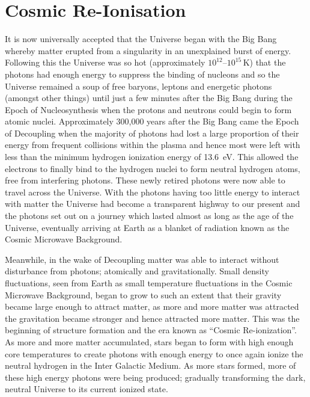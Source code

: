
\section{Cosmic Re-Ionisation} %
\label{sec:cosmic_re_ionisation}
	It is now universally accepted that the Universe began with the Big Bang whereby matter erupted from a singularity in an unexplained burst of energy. Following this the Universe was so hot (approximately $10^{12}$--$10^{15}$\,\si{\kelvin}\cite{liddle2003introduction}) that the photons had enough energy to suppress the binding of nucleons and so the Universe remained a soup of free baryons, leptons and energetic photons (amongst other things) until just a few minutes after the Big Bang during the Epoch of Nucleosynthesis when the protons and neutrons could begin to form atomic nuclei. Approximately 300,000\cite{liddle2003introduction} years after the Big Bang came the Epoch of Decoupling when the majority of photons had lost a large proportion of their energy from frequent collisions within the plasma and hence most were left with less than the minimum hydrogen ionization energy of \SI{13.6}{\electronvolt}. This allowed the electrons to finally bind to the hydrogen nuclei to form neutral hydrogen atoms, free from interfering photons. These newly retired photons were now able to travel across the Universe. With the photons having too little energy to interact with matter the Universe had become a transparent highway to our present and the photons set out on a journey which lasted almost as long as the age of the Universe, eventually arriving at Earth as a blanket of radiation known as the Cosmic Microwave Background.

	Meanwhile, in the wake of Decoupling matter was able to interact without disturbance from photons; atomically and gravitationally. Small density fluctuations, seen from Earth as small temperature fluctuations in the Cosmic Microwave Background, began to grow to such an extent that their gravity became large enough to attract matter, as more and more matter was attracted the gravitation became stronger and hence attracted more matter. This was the beginning of structure formation and the era known as ``Cosmic Re-ionization''. As more and more matter accumulated, stars began to form with high enough core temperatures to create photons with enough energy to once again ionize the neutral hydrogen in the Inter Galactic Medium. As more stars formed, more of these high energy photons were being produced; gradually transforming the dark, neutral Universe to its current ionized state.

